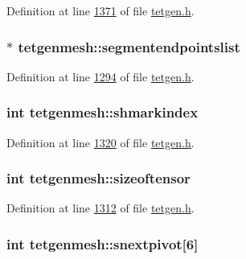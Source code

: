 Definition at line \hyperlink{tetgen_8h_source_l01371}{1371} of file \hyperlink{tetgen_8h_source}{tetgen.\+h}.

\subsubsection[{\texorpdfstring{segmentendpointslist}{segmentendpointslist}}]{$\ast$ tetgenmesh\+::segmentendpointslist}\hypertarget{classtetgenmesh_a94baa4b30f5978236d410519d2630f7a}{}\label{classtetgenmesh_a94baa4b30f5978236d410519d2630f7a}


Definition at line \hyperlink{tetgen_8h_source_l01294}{1294} of file \hyperlink{tetgen_8h_source}{tetgen.\+h}.

\subsubsection[{\texorpdfstring{shmarkindex}{shmarkindex}}]{\setlength{\rightskip}{0pt plus 5cm}int tetgenmesh\+::shmarkindex}\hypertarget{classtetgenmesh_a95a36881e979fdd33fce53dfe621dd27}{}\label{classtetgenmesh_a95a36881e979fdd33fce53dfe621dd27}


Definition at line \hyperlink{tetgen_8h_source_l01320}{1320} of file \hyperlink{tetgen_8h_source}{tetgen.\+h}.

\subsubsection[{\texorpdfstring{sizeoftensor}{sizeoftensor}}]{\setlength{\rightskip}{0pt plus 5cm}int tetgenmesh\+::sizeoftensor}\hypertarget{classtetgenmesh_a7b22b70662c2fe714e5eb9264c56c47b}{}\label{classtetgenmesh_a7b22b70662c2fe714e5eb9264c56c47b}


Definition at line \hyperlink{tetgen_8h_source_l01312}{1312} of file \hyperlink{tetgen_8h_source}{tetgen.\+h}.

\subsubsection[{\texorpdfstring{snextpivot}{snextpivot}}]{\setlength{\rightskip}{0pt plus 5cm}int tetgenmesh\+::snextpivot\mbox{[}6\mbox{]}\hspace{0.3cm}{\ttfamily [static]}}\hypertarget{classtetgenmesh_a4ad02da44e220a832cd15ad5ed389760}{}\label{classtetgenmesh_a4ad02da44e220a832cd15ad5ed389760}


